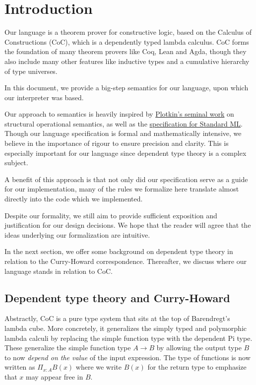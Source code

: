 \documentclass{article}
\begin{document}
\section{Introduction}
Our language is a theorem prover for constructive logic, based on 
the Calculus of Constructions (CoC), which is a dependently typed lambda calculus.
CoC forms the foundation of many theorem provers like Coq, Lean and Agda, 
though they also include many other features like inductive types and a 
cumulative hierarchy of type universes.

In this document, we provide a big-step semantics for our language, upon which
our interpreter was based.

Our approach to semantics is heavily inspired by 
\href{https://homepages.inf.ed.ac.uk/gdp/publications/sos_jlap.pdf}
{Plotkin's seminal work} on structural operational semantics, as well as the 
\href{https://smlfamily.github.io/sml97-defn.pdf}{specification for Standard ML}.
Though our language specification is formal and mathematically
intensive, we believe in the importance of rigour to ensure precision and clarity.
This is especially important for our language since dependent type theory is a
complex subject.

A benefit of this approach is that not only did our specification serve as a
guide for our implementation, many of the rules we formalize here
translate almost directly into the code which we implemented.

Despite our formality, we still aim to provide sufficient exposition and
justification for our design decisions.
We hope that the reader will agree that the ideas underlying our formalization
are intuitive. 

In the next section, we offer some background on dependent type theory in 
relation to the Curry-Howard correspondence. Thereafter, we discuss where our
language stands in relation to CoC.

\subsection{Dependent type theory and Curry-Howard}
Abstractly, CoC is a pure type system that sits at the top of Barendregt's
lambda cube.
More concretely, it generalizes the simply typed and polymorphic
lambda calculi by replacing the simple function type with the dependent Pi type.
These generalize the simple function type $A \to B$ by allowing the output type
$B$ to now \textit{depend on the value} of the input expression.
The type of functions is now written as $\Pi_{x : A} B(x)$ where
we write $B(x)$ for the return type to emphasize that $x$ may appear free in
$B$.
\end{document}
